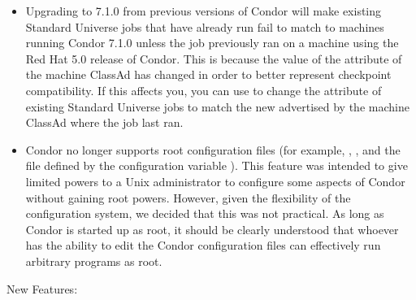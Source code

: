 \begin{itemize}

\item Upgrading to 7.1.0 from previous versions of Condor will make
existing Standard Universe jobs that have already run fail to match to
machines running Condor 7.1.0 unless the job previously ran on a
machine using the Red Hat 5.0 release of Condor.  This is because the
value of the  attribute of the machine
ClassAd has changed in order to better represent checkpoint
compatibility.  If this affects you, you can use  to
change the  attribute of existing
Standard Universe jobs to match the new 
advertised by the machine ClassAd where the job last ran.

\item Condor no longer supports root configuration files
(for example, ,
, and
the file defined by the configuration variable
).  This feature was intended to
give limited powers to a Unix administrator to configure some aspects
of Condor without gaining root powers.  However, given the flexibility
of the configuration system, we decided that this was not practical.
As long as Condor is started up as root, it should be clearly
understood that whoever has the ability to edit the Condor
configuration files can effectively run arbitrary programs as root.

\end{itemize}


\noindent New Features:

